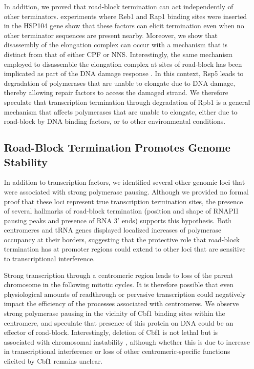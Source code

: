 In addition, we proved that road-block termination can act independently of other terminators.
\Invivo{} experiments where Reb1 and Rap1 binding sites were inserted in the HSP104 gene show that these factors can elicit termination even when no other terminator sequences are present nearby. 
Moreover, we show that disassembly of the elongation complex can occur with a mechanism that is distinct from that of either CPF or NNS. 
Interestingly, the same mechanism employed to disassemble the elongation complex at sites of road-block has been implicated as part of the DNA damage response \cite{beaudenon:1999:rsp5}. 
In this context, Rsp5 leads to degradation of polymerases that are unable to elongate due to DNA damage, thereby allowing repair factors to access the damaged strand. 
We therefore speculate that transcription termination through degradation of Rpb1 is a general mechanism that affects polymerases that are unable to elongate, either due to road-block by DNA binding factors, or to other environmental conditions.

\subsection{Road-Block Termination Promotes Genome Stability}

In addition to transcription factors, we identified several other genomic loci that were associated with strong polymerase pausing. 
Although we provided no formal proof that these loci represent true transcription termination sites, the presence of several hallmarks of road-block termination (position and shape of RNAPII pausing peaks and presence of RNA 3’ ends) supports this hypothesis. 
Both centromeres and tRNA genes displayed localized increases of polymerase occupancy at their borders, suggesting that the protective role that road-block termination has at promoter regions could extend to other loci that are sensitive to transcriptional interference. 

Strong transcription through a centromeric region leads to loss of the parent chromosome \cite{apostol:1988:copy} in the following mitotic cycles. 
It is therefore possible that even physiological amounts of readthrough or pervasive transcription could negatively impact the efficiency of the processes associated with centromeres. 
We observe strong polymerase pausing in the vicinity of Cbf1 binding sites within the centromere, and speculate that presence of this protein on DNA could be an effector of road-block. 
Interestingly, deletion of Cbf1 is not lethal but is associated with chromosomal instability \cite{cai:1990:yeast}, although whether this is due to increase in transcriptional interference or loss of other centromeric-specific functions elicited by Cbf1 remains unclear.


